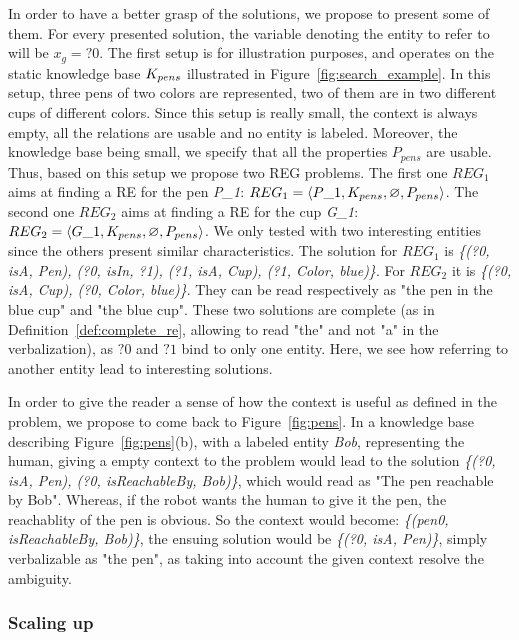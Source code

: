 \documentclass[a4paper,11pt,twoside]{StyleThese}
\begin{document}
In order to have a better grasp of the solutions, we propose to present some of them. For every presented solution, the variable denoting the entity to refer to will be $x_g = ?0$.
The first setup is for illustration purposes, and operates on the static knowledge base $K_{pens}$ illustrated in Figure~\ref{fig:search_example}. In this setup, three pens of two colors are represented, two of them are in two different cups of different colors.
Since this setup is really small, the context is always empty, all the relations are usable and no entity is labeled. Moreover, the knowledge base being small, we specify that all the properties $P_{pens}$ are usable.
Thus, based on this setup we propose two REG problems. The first one $REG_1$ aims at finding a RE for the pen \textit{P\_1}: $REG_1 = \langle P\_1, K_{pens}, \varnothing, P_{pens} \rangle$. The second one $REG_2$ aims at finding a RE for the cup \textit{G\_1}: $REG_2 = \langle G\_1, K_{pens}, \varnothing, P_{pens} \rangle$.
We only tested with two interesting entities since the others present similar characteristics.
The solution for $REG_1$ is \textit{\{(?0, isA, Pen), (?0, isIn, ?1), (?1, isA, Cup), (?1, Color, blue)\}}. For $REG_2$ it is \textit{\{(?0, isA, Cup), (?0, Color, blue)\}}. They can be read respectively as "the pen in the blue cup" and "the blue cup". These two solutions are complete (as in Definition~\ref{def:complete_re}, allowing to read "the" and not "a" in the verbalization), as $?0$ and $?1$ bind to only one entity. Here, we see how referring to another entity lead to interesting solutions.

In order to give the reader a sense of how the context is useful as defined in the problem, we propose to come back to Figure~\ref{fig:pens}.
In a knowledge base describing Figure~\ref{fig:pens}(b), with a labeled entity \textit{Bob}, representing the human, giving a empty context to the problem would lead to the solution \textit{\{(?0, isA, Pen), (?0, isReachableBy, Bob)\}}, which would read as "The pen reachable by Bob". Whereas, if the robot wants the human to give it the pen, the reachablity of the pen is obvious. So the context would become: \textit{\{(pen0, isReachableBy, Bob)\}}, the ensuing solution would be \textit{\{(?0, isA, Pen)\}}, simply verbalizable as "the pen", as taking into account the given context resolve the ambiguity.

\subsubsection{Scaling up}
\end{document}
